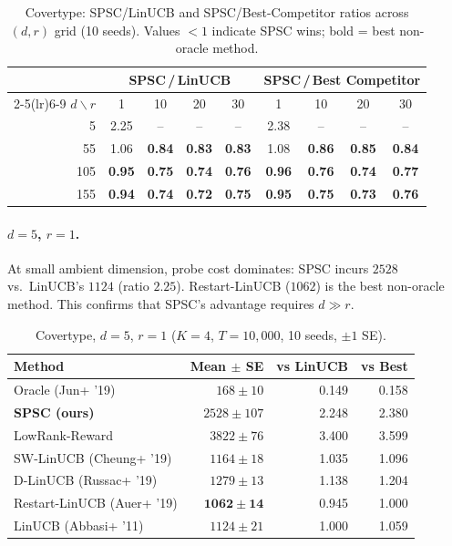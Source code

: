 \documentclass{article}
\begin{document}
{  \begin{table}[!htpb]
  \centering
  \caption{Covertype: SPSC/LinUCB and SPSC/Best-Competitor ratios across $(d,r)$ grid (10 seeds). Values ${<}1$
  indicate SPSC wins; bold = best non-oracle method.}
  \label{tab:covertype_ratio}
  \small
  \begin{tabular}{r@{\hspace{6pt}}cccc@{\hspace{12pt}}cccc}
  \toprule
  & \multicolumn{4}{c}{SPSC\,/\,LinUCB} & \multicolumn{4}{c}{SPSC\,/\,Best Competitor} \\
  \cmidrule(lr){2-5}\cmidrule(lr){6-9}
  $d \backslash r$ & 1 & 10 & 20 & 30 & 1 & 10 & 20 & 30 \\
  \midrule
  5   & 2.25 & --   & --   & --   & 2.38 & --   & --   & --   \\
  55  & 1.06 & \textbf{0.84} & \textbf{0.83} & \textbf{0.83} & 1.08 & \textbf{0.86} & \textbf{0.85} & \textbf{0.84}
  \\
  105 & \textbf{0.95} & \textbf{0.75} & \textbf{0.74} & \textbf{0.76} & \textbf{0.96} & \textbf{0.76} & \textbf{0.74}
   & \textbf{0.77} \\
  155 & \textbf{0.94} & \textbf{0.74} & \textbf{0.72} & \textbf{0.75} & \textbf{0.95} & \textbf{0.75} & \textbf{0.73}
   & \textbf{0.76} \\
  \bottomrule
  \end{tabular}
  \end{table}

  \paragraph{$d=5$, $r=1$.}
  At small ambient dimension, probe cost dominates: SPSC incurs $2528$ vs.\ LinUCB's $1124$ (ratio $2.25$).
  Restart-LinUCB ($1062$) is the best non-oracle method. This confirms that SPSC's advantage requires $d \gg r$.

  \begin{table}[!htpb]
  \centering
  \caption{Covertype, $d=5$, $r=1$ ($K{=}4$, $T{=}10{,}000$, 10 seeds, $\pm 1$ SE).}
  \label{tab:covtype_d5}
  \small
  \begin{tabular}{lrrr}
  \toprule
  Method & Mean $\pm$ SE & vs LinUCB & vs Best \\
  \midrule
  Oracle (Jun+ '19) & $168 \pm 10$ & 0.149 & 0.158 \\
  \textbf{SPSC (ours)} & $2528 \pm 107$ & 2.248 & 2.380 \\
  LowRank-Reward & $3822 \pm 76$ & 3.400 & 3.599 \\
  SW-LinUCB (Cheung+ '19) & $1164 \pm 18$ & 1.035 & 1.096 \\
  D-LinUCB (Russac+ '19) & $1279 \pm 13$ & 1.138 & 1.204 \\
  Restart-LinUCB (Auer+ '19) & $\mathbf{1062 \pm 14}$ & 0.945 & 1.000 \\
  LinUCB (Abbasi+ '11) & $1124 \pm 21$ & 1.000 & 1.059 \\
  \bottomrule
  \end{tabular}
  \end{table}

}
\end{document}
